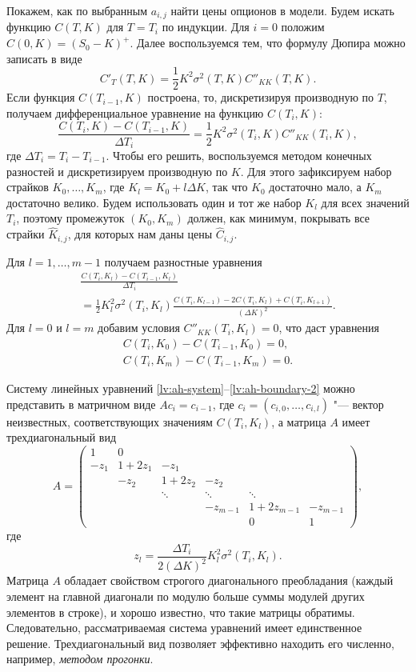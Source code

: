 Покажем, как по выбранным $a_{i,j}$ найти цены опционов в модели.
Будем искать функцию $C(T,K)$ для $T=T_i$ по индукции. Для $i=0$ положим $C(0, K) = (S_0-K)^+$.
Далее воспользуемся тем, что формулу Дюпира можно записать в виде
\[
C'_T(T,K) = \frac12 K^2 \sigma^2(T,K)C''_{KK}(T,K).
\]
Если функция $C(T_{i-1}, K)$ построена, то, дискретизируя производную по $T$, получаем дифференциальное уравнение на функцию $C(T_i,K)$:
\[
\frac{C(T_{i},K) - C(T_{i-1},K)}{\Delta T_i} = \frac12 K^2 \sigma^2(T_i,K)C''_{KK}(T_i,K),
\]
где $\Delta T_i = T_i - T_{i-1}$.
Чтобы его решить, воспользуемся методом конечных разностей и дискретизируем производную по $K$.
Для этого зафиксируем набор страйков $K_0,\dots,K_m$, где $K_l = K_0 + l\Delta K$, так что $K_0$ достаточно мало, а $K_m$ достаточно велико.
Будем использовать один и тот же набор $K_l$ для всех значений $T_i$, поэтому промежуток $(K_0, K_m)$ должен, как минимум, покрывать все страйки $\hat K_{i,j}$, для которых нам даны цены $\hat C_{i,j}$.

Для $l=1,\dots,m-1$ получаем разностные уравнения
\begin{multline}
\label{lv:ah-system}
\frac{C(T_i,K_l) - C(T_{i-1}, K_l)}{\Delta T_i} \\
= \frac12 K_l^2 \sigma^2(T_i,K_l) \frac{C(T_i,K_{l-1}) -2C(T_i,K_l) + C(T_i,K_{l+1})}{(\Delta K)^2}.
\end{multline}
Для $l=0$ и $l=m$ добавим условия $C''_{KK}(T_i,K_l) = 0$, что даст уравнения
\begin{gather}
\label{lv:ah-boundary-1}
C(T_i,K_0) - C(T_{i-1}, K_0) = 0,\\
\label{lv:ah-boundary-2}
C(T_i,K_m) - C(T_{i-1}, K_m) = 0.
\end{gather}

Систему линейных уравнений \eqref{lv:ah-system}--\eqref{lv:ah-boundary-2} можно представить в матричном виде $A c_i = c_{i-1}$, где $c_i=(c_{i,0},\dots,c_{i,l})$ "--- вектор неизвестных, соответствующих значениям $C(T_i,K_l)$, а матрица $A$ имеет трехдиагональный вид
\[
A = \begin{pmatrix}
1 & 0 \\
-z_1 &1+2z_1 & -z_1\\
& -z_2 &1+2z_2 & -z_2\\
& & \ddots & \ddots & \ddots \\
& & & -z_{m-1} &1+2z_{m-1} & -z_{m-1}\\
& & & & 0 & 1
\end{pmatrix},
\]
где
\[
z_l = \frac{\Delta T_i}{2(\Delta K)^2} K_l^2\sigma^2(T_i,K_l).
\]
Матрица $A$ обладает свойством строгого диагонального преобладания (каждый элемент на главной диагонали по модулю больше суммы модулей других элементов в строке), и хорошо известно, что такие матрицы обратимы.
Следовательно, рассматриваемая система уравнений имеет единственное решение.
Трехдиагональный вид позволяет эффективно находить его численно, например, \emph{методом прогонки}.

